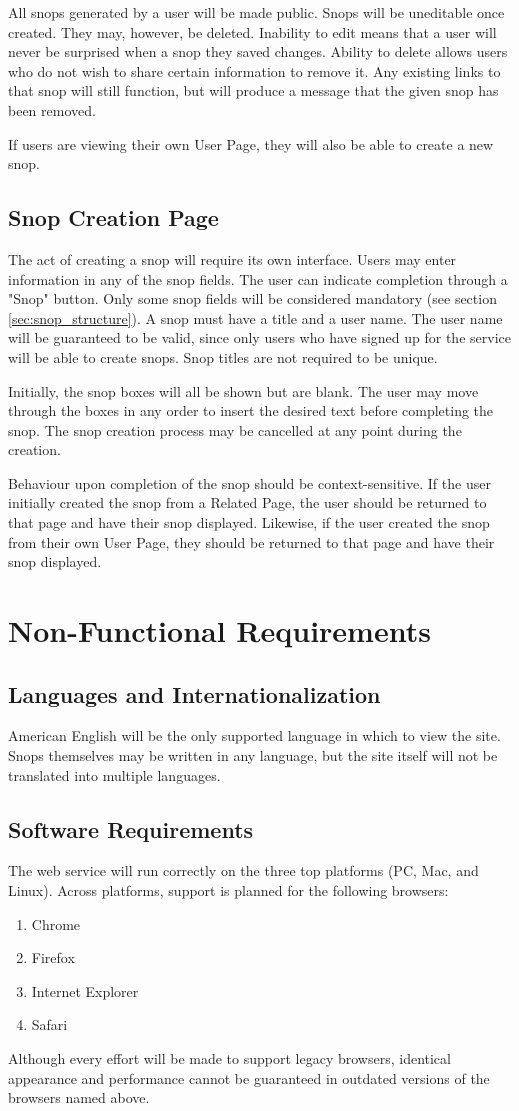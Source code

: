 \documentclass[11pt]{article}
\begin{document}
All snops generated by a user will be made public. Snops will be uneditable once created. They may, however, be deleted. Inability to edit means that a user will never be surprised when a snop they saved changes. Ability to delete allows users who do not wish to share certain information to remove it. Any existing links to that snop will still function, but will produce a message that the given snop has been removed. 

If users are viewing their own User Page, they will also be able to create a new snop.
\subsection{Snop Creation Page}
The act of creating a snop will require its own interface. Users may enter information in any of the snop fields. The user can indicate completion through a "Snop" button. Only some snop fields will be considered mandatory (see section \ref{sec:snop_structure}). A snop must have a title and a user name. The user name will be guaranteed to be valid, since only users who have signed up for the service will be able to create snops. Snop titles are not required to be unique.

Initially, the snop boxes will all be shown but are blank. The user may move through the boxes in any order to insert the desired text before completing the snop. The snop creation process may be cancelled at any point during the creation. 

Behaviour upon completion of the snop should be context-sensitive. If the user initially created the snop from a Related Page, the user should be returned to that page and have their snop displayed. Likewise, if the user created the snop from their own User Page, they should be returned to that page and have their snop displayed.
\section{Non-Functional Requirements}
\subsection{Languages and Internationalization}
American English will be the only supported language in which to view the site. Snops themselves may be written in any language, but the site itself will not be translated into multiple languages.
\subsection{Software Requirements}
The web service will run correctly on the three top platforms (PC, Mac, and Linux). Across platforms, support is planned for the following browsers:
\begin{enumerate}
\item Chrome
\item Firefox
\item Internet Explorer
\item Safari
\end{enumerate}
Although every effort will be made to support legacy browsers, identical appearance and performance cannot be guaranteed in outdated versions of the browsers named above.
\end{document}
